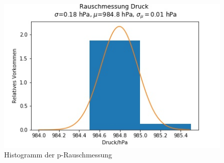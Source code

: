 \documentclass[]{article}
\begin{document}
\begin{figure}
	\begin{center}
		\includegraphics[scale=0.9]{Images/RauschmessungRT_p_histo.jpg}
		\caption{Histogramm der p-Rauschmessung}
		\label{RM_p_histo}
	\end{center}
\end{figure}
\end{document}
